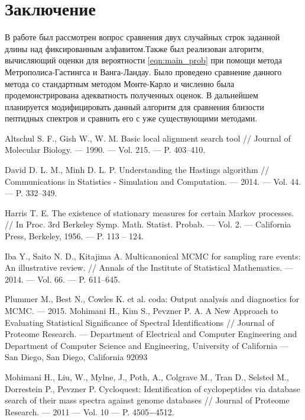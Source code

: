 \documentclass{spisok-article}
\begin{document}
\section{Заключение}
 В работе был рассмотрен вопрос сравнения двух случайных строк заданной длины над фиксированным алфавитом.Также был реализован алгоритм, вычисляющий оценки для вероятности \eqref{eqn:main_prob} при помощи метода Метрополиса-Гастингса и Ванга-Ландау.
Было проведено сравнение данного метода со стандартным методом Монте-Карло и численно была продемонстрирована адекватность полученных оценок.
В дальнейшем планируется модифицировать данный алгоритм для сравнения близости пептидных спектров и сравнить его с уже существующими методами.

\renewcommand\refname{Литература}
\begin{thebibliography}{8}
 Altschul S. F., Gish W., W. M. Basic local alignment search tool // Journal of Molecular
Biology. --- 1990. --- Vol. 215. --- P. 403–410.

 David D. L. M., Minh D. L. P. Understanding the Hastings algorithm // Communications
in Statistics - Simulation and Computation. --- 2014. --- Vol. 44. --- P. 332–349.

 Harris T. E. The existence of stationary measures for certain Markov processes. // In
Proc. 3rd Berkeley Symp. Math. Statist. Probab. --- Vol. 2. --- California Press, Berkeley,
1956. --- P. 113 -- 124.

 Iba Y., Saito N. D., Kitajima A. Multicanonical MCMC for sampling rare events: An illustrative
review. // Annals of the Institute of Statistical Mathematics. --- 2014. --- Vol. 66. ---
P. 611–645.

 Plummer M., Best N., Cowles K. et al. coda: Output analysis and diagnostics for
MCMC. --- 2015. 
 Mohimani H., Kim S., Pevzner P. A. A New Approach to Evaluating Statistical Significance of Spectral
Identifications // Journal of Proteome Research. --- Department of Electrical and Computer Engineering and Department of Computer Science and Engineering, University of
California --- San Diego, San Diego, California 92093 

 Mohimani H., Liu, W., Mylne, J., Poth, A., Colgrave M., Tran D., Selsted M., Dorrestein P., Pevzner P. Cycloquest: Identification of cyclopeptides via database search of their mass spectra against
genome databases // Journal of Proteome Research. --- 2011 --- Vol. 10 --- P. 4505−4512.

\end{thebibliography}
\end{document}
